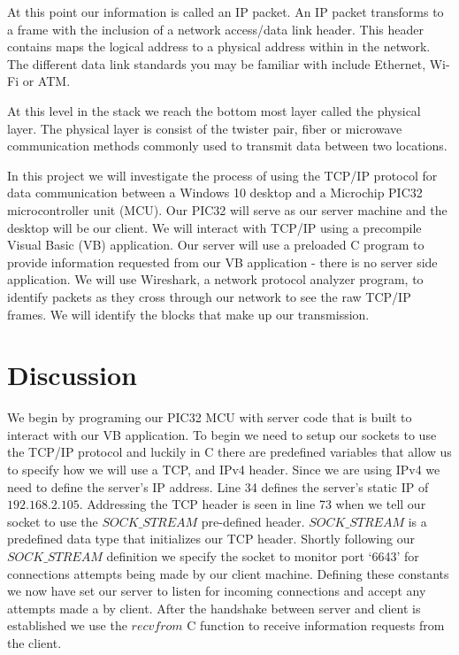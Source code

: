 \documentclass[12pt]{article}
\begin{document}
At this point our information is called an IP packet. An IP packet 
transforms to a frame with the inclusion of a network access/data link 
header. This header contains maps the logical address to a physical address 
within in the network. The different data link standards you may be 
familiar with include Ethernet, Wi-Fi or ATM.

At this level in the stack we reach the bottom most layer called the 
physical layer. The physical layer is consist of the twister pair, fiber 
or microwave communication methods commonly used to transmit data between 
two locations. 

In this project we will investigate the process of using the TCP/IP 
protocol for data communication between a Windows 10 desktop and a 
Microchip PIC32 microcontroller unit (MCU). Our PIC32 will serve as our 
server machine and the desktop will be our client. We will interact with 
TCP/IP using a precompile Visual Basic (VB) application. Our server will 
use a preloaded C program to provide information requested from our VB 
application - there is no server side application. We will use Wireshark, 
a network protocol analyzer program, to identify packets as they cross
through our network to see the raw TCP/IP frames. We will identify the 
blocks that make up our transmission.

\section{Discussion}
We begin by programing our PIC32 MCU with server code that is built to 
interact with our VB application. To begin we need to setup our sockets to 
use the TCP/IP protocol and luckily in C there are predefined variables 
that allow us to specify how we will use a TCP, and IPv4 header. Since we 
are using IPv4 we need to define the server’s IP address. Line 34 defines 
the server’s static IP of $192.168.2.105$. Addressing the TCP header is 
seen in line 73 when we tell our socket to use the $SOCK\_STREAM$ 
pre-defined header. $SOCK\_STREAM$ is a predefined data type that 
initializes our TCP header.  Shortly following our $SOCK\_STREAM$ definition
we specify the socket to monitor port ‘6643’ for connections attempts 
being made by our client machine. Defining these constants we now have 
set our server to listen for incoming connections and accept any attempts 
made a by client. After the handshake between server and client is 
established we use the $recvfrom$ C function to receive information 
requests from the client. 
\end{document}
